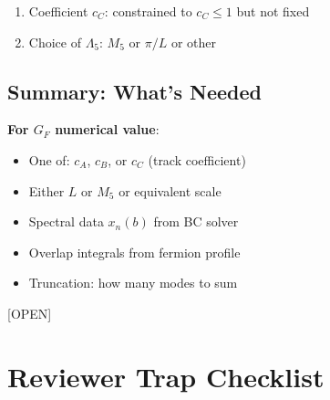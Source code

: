 \documentclass[11pt,a4paper]{article}
\newcommand{\tagOPEN}{\textcolor{red!70!black}{[OPEN]}}
\begin{document}
\begin{enumerate}
    \item Coefficient $c_C$: constrained to $c_C \leq 1$ but not fixed
    \item Choice of $\Lambda_5$: $M_5$ or $\pi/L$ or other
\end{enumerate}

\subsection{Summary: What's Needed}

\begin{openbox}
\textbf{For $G_F$ numerical value}:
\begin{itemize}
    \item One of: $c_A$, $c_B$, or $c_C$ (track coefficient)
    \item Either $L$ or $M_5$ or equivalent scale
    \item Spectral data $x_n(b)$ from BC solver
    \item Overlap integrals from fermion profile
    \item Truncation: how many modes to sum
\end{itemize}
\tagOPEN
\end{openbox}

\section{Reviewer Trap Checklist}
\end{document}
